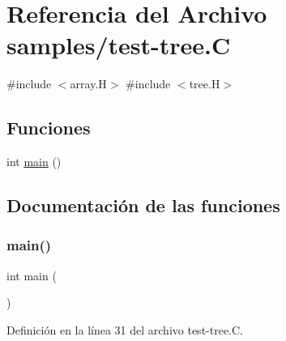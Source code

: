 \hypertarget{test-tree_8_c}{}\section{Referencia del Archivo samples/test-\/tree.C}
\label{test-tree_8_c}
{\ttfamily \#include $<$array.\+H$>$}\newline
{\ttfamily \#include $<$tree.\+H$>$}\newline
\subsection*{Funciones}
\begin{DoxyCompactItemize}
\item 
int \hyperlink{test-tree_8_c_ae66f6b31b5ad750f1fe042a706a4e3d4}{main} ()
\end{DoxyCompactItemize}


\subsection{Documentación de las funciones}
\mbox{\label{test-tree_8_c_ae66f6b31b5ad750f1fe042a706a4e3d4}} 
\subsubsection{\texorpdfstring{main()}{main()}}
{\footnotesize\ttfamily int main (\begin{DoxyParamCaption}{ }\end{DoxyParamCaption})}



Definición en la línea 31 del archivo test-\/tree.\+C.

